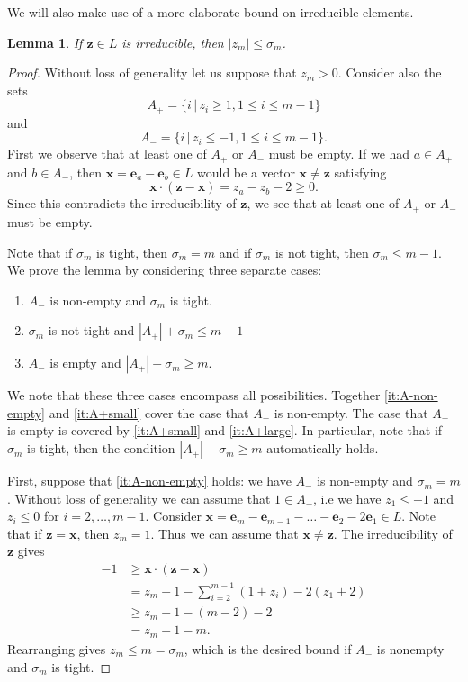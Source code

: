 \documentclass{amsart} %
\newcommand{\e}{\bm{e}}
\theoremstyle{thm}
\newtheorem{lem}[Theorem]{Lemma}
\theoremstyle{definition}
\numberwithin{equation}{section}
\begin{document}
We will also make use of a more elaborate bound on irreducible elements.
\begin{lem}\label{lem:sigma_m_bound}
If $\bm{z}\in L$ is irreducible, then $|z_m|\leq \sigma_m$.
\end{lem}
\begin{proof}
Without loss of generality let us suppose that $z_m>0$. Consider also the sets
\[
A_+=\{i\,|\, z_i\geq 1, 1\leq i \leq m-1\}
\]
and
\[
A_-=\{i\,|\, z_i\leq -1, 1\leq i \leq m-1\}.
\]
First we observe that at least one of $A_+$ or $A_-$ must be empty. If we had $a\in A_+$ and $b\in A_-$, then $\bm{x}=\e_a-\e_b\in L$ would be a vector $\bm{x}\neq \bm{z}$ satisfying 
\[
\bm{x}\cdot (\bm{z}-\bm{x})=z_a-z_b-2\geq 0.
\]
Since this contradicts the irreducibility of $\bm{z}$, we see that at least one of $A_+$ or $A_-$ must be empty.

Note that if $\sigma_m$ is tight, then $\sigma_m=m$ and if $\sigma_m$ is not tight, then $\sigma_m\leq m-1$. We prove the lemma by considering three separate cases:
\begin{enumerate}%
    \item\label{it:A-non-empty} $A_-$ is non-empty and $\sigma_m$ is tight.
    \item\label{it:A+small} $\sigma_m$ is not tight and $|A_+|+\sigma_m\leq m-1$
    \item\label{it:A+large} $A_-$ is empty and $|A_+|+\sigma_m\geq m$.
\end{enumerate}
We note that these three cases encompass all possibilities. Together \eqref{it:A-non-empty} and \eqref{it:A+small} cover the case that $A_-$ is non-empty. The case that $A_-$ is empty is covered by \eqref{it:A+small} and \eqref{it:A+large}. In particular, note that if $\sigma_m$ is tight, then the condition $|A_+|+\sigma_m\geq m$ automatically holds. 

First, suppose that \eqref{it:A-non-empty} holds: we have $A_-$ is non-empty and $\sigma_m=m$. Without loss of generality we can assume that $1\in A_-$, i.e we have $z_1\leq -1$ and $z_i\leq 0$ for $i=2,\dots, m-1$. Consider $\bm{x}=\e_m-\e_{m-1}-\dots - \e_2 -2\e_1\in L$. Note that if $\bm{z}=\bm{x}$, then $z_m=1$. Thus we can assume that $\bm{x}\neq \bm{z}$.
The irreducibility of $\bm{z}$ gives 
\begin{align*}
    -1&\geq \bm{x}\cdot (\bm{z}-\bm{x}) \\
    &= z_m-1 - \sum_{i=2}^{m-1} (1+z_i) -2(z_1+2)\\
    & \geq z_m -1 -(m-2) -2\\
    &= z_m -1 -m.
\end{align*}
Rearranging gives $z_m\leq m=\sigma_m$, which is the desired bound if $A_-$ is nonempty and $\sigma_m$ is tight.


\end{proof}
\end{document}
